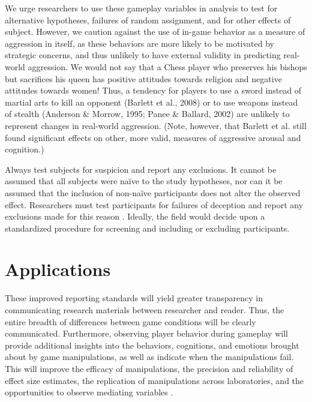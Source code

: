 We urge researchers to use these gameplay variables in analysis to test for alternative hypotheses, failures of random assignment, and for other effects of subject. However, we caution against the use of in-game behavior as a measure of aggression in itself, as these behaviors are more likely to be motivated by strategic concerns, and thus unlikely to have external validity in predicting real-world aggression. We would not say that a Chess player who preserves his bishops but sacrifices his queen has positive attitudes towards religion and negative attitudes towards women! Thus, a tendency for players to use a sword instead of martial arts to kill an opponent (Barlett et al., 2008) or to use weapons instead of stealth (Anderson & Morrow, 1995; Panee & Ballard, 2002) are unlikely to represent changes in real-world aggression. (Note, however, that Barlett et al. still found significant effects on other, more valid, measures of aggressive arousal and cognition.)
	
Always test subjects for suspicion and report any exclusions. It cannot be assumed that all subjects were naïve to the study hypotheses, nor can it be assumed that the inclusion of non-naïve participants does not alter the observed effect. Researchers must test participants for failures of deception and report any exclusions made for this reason . Ideally, the field would decide upon a standardized procedure for screening and including or excluding participants.

\section{Applications}
These improved reporting standards will yield greater transparency in communicating research materials between researcher and reader. Thus, the entire breadth of differences between game conditions will be clearly communicated. Furthermore, observing player behavior during gameplay will provide additional insights into the behaviors, cognitions, and emotions brought about by game manipulations, as well as indicate when the manipulations fail. This will improve the efficacy of manipulations, the precision and reliability of effect size estimates, the replication of manipulations across laboratories, and the opportunities to observe mediating variables .
